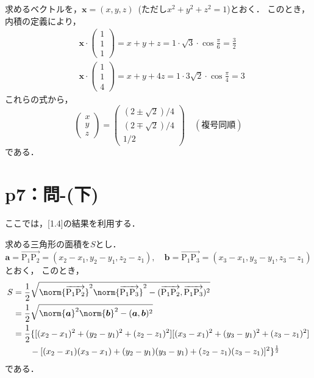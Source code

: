 \begin{tanswer}
  求めるベクトルを，$\bm{x}=(x,y,z)$~(ただし$x^2+y^2 +z^2=1$)とおく．
  このとき，内積の定義により，
  \begin{align*}
     & \bm{x} \cdot
    \begin{pmatrix}
      1 \\
      1 \\
      1
    \end{pmatrix}
    =x+y+z= 1 \cdot \sqrt{3} \cdot \cos \frac{\pi}{6} =\frac{3}{2} \\
     & \bm{x} \cdot
    \begin{pmatrix}
      1 \\
      1 \\
      4
    \end{pmatrix}
    =x+y+4z= 1 \cdot 3\sqrt{2} \cdot \cos \frac{\pi}{4} =3
  \end{align*}
  これらの式から，
  \begin{equation*}
    \begin{pmatrix}
      x \\
      y \\
      z
    \end{pmatrix}
    =
    \begin{pmatrix}
      (2 \pm \sqrt{2})/4 \\
      (2 \mp \sqrt{2})/4 \\
      1/2
    \end{pmatrix}
    \quad (\text{複号同順})
  \end{equation*}
  である．
\end{tanswer}
\section*{p7：問-(下)}
\begin{tanswer}
  ここでは，[1.4]の結果を利用する．

  求める三角形の面積を$S$とし．
  \[
    \bm{a}=\overrightarrow{\mathrm{P_1 P_2}}=(x_2-x_1,y_2-y_1,z_2-z_1),\quad \bm{b}=\overrightarrow{\mathrm{P_1 P_3}}=(x_3-x_1,y_3-y_1,z_3-z_1)
  \]
  とおく，
  このとき，
  \begin{align*}
    S & = \frac{1}{2} \sqrt{\norm{\overrightarrow{\mathrm{P_1 P_2}}}^2 \norm{\overrightarrow{\mathrm{P_1 P_3}}}^2 - (\overrightarrow{\mathrm{P_1 P_2}}, \overrightarrow{\mathrm{P_1 P_3}})^2} \\
      & = \frac{1}{2} \sqrt{\norm{\bm{a}}^2 \norm{\bm{b}}^2 - (\bm{a},\bm{b})^2 }                                                                                                             \\
      & = \frac{1}{2} \{ \lbrack (x_2 - x_1)^2+(y_2-y_1)^2+ (z_2 - z_1)^2 \rbrack \lbrack (x_3 - x_1)^2+(y_3-y_1)^2+ (z_3 - z_1)^2 \rbrack                                                    \\
      & \qquad - \lbrack (x_2-x_1)(x_3-x_1)+(y_2 -y_1)(y_3-y_1)+(z_2-z_1)(z_3-z_1)\rbrack ^2\}^{\frac{1}{2}}
  \end{align*}
  である．
\end{tanswer}




